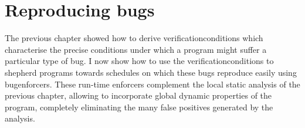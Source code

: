 \chapter{Reproducing bugs}
\label{sect:reproducing_bugs}

The previous chapter showed how to derive
\glspl{verificationcondition} which characterise the precise
conditions under which a program might suffer a particular type of
bug.  I now show how to use the \glspl{verificationcondition} to
shepherd programs towards schedules on which these bugs reproduce
easily using \glspl{bugenforcer}.  These run-time enforcers complement
the local static analysis of the previous chapter, allowing
{\technique} to incorporate global dynamic properties of the program,
completely eliminating the many false positives generated by the
{\StateMachine} analysis.

